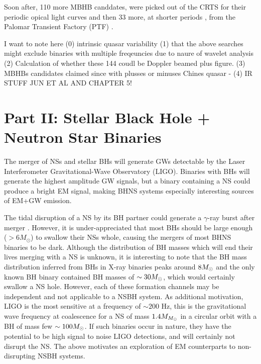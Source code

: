 Soon after, 110 more MBHB canddates, were picked out of the CRTS for
their periodic opical light curves \citep{Graham:2015b} and then 33 more, at
shorter periods \citep{CharisiMBHBs:2016}, from the Palomar Transient Factory
(PTF) \citep{}.

I want to note here 
(0) intrinsic quasar variability
(1) that the above searches might exclude binaries with multiple freqeuncies due to naure of wavelet analysis
(2) Calculation of whether these 144 coudl be Doppler beamed plus figure.
(3) MBHBs candidates claimed since with plusses or minuses
	Chines quasar - 
(4) IR STUFF JUN ET AL AND CHAPTER 5!






\section{Part II: Stellar Black Hole + Neutron Star Binaries}
%

The merger of NSs and stellar BHs will generate GWs detectable by the Laser
Interferometer Gravitational-Wave Observatory (LIGO). Binaries with BHs will
generate the highest amplitude GW signals, but a binary containing a NS could
produce a bright EM signal, making BHNS systems especially interesting sources
of EM+GW emission.

The tidal disruption of a NS by its BH partner could generate a $\gamma$-ray
burst after merger \citep{NPP:NSBH_GRB:1992}. However, it is under-appreciated
that most BHs should be large enough ($> 6M_\odot $) to swallow their NSs
whole, causing the mergers of most BHNS binaries to be dark. 
Although the distribution of BH masses
which will end their lives merging with a NS is unknown, it is interesting to
note that the BH mass distribution inferred from BHs in X-ray binaries peaks
around $8 {M_{\odot}}$ \citep{Orzel:2008} and the only known BH binary contained BH
masses of $\sim 30 {M_{\odot}}$, which would certainly swallow a NS hole. However,
each of these formation channels may be independent and not applicable to a
NSBH system. As additional motivation, LIGO is the most sensitive at a
frequency of $\sim 200$ Hz, this is the gravitational wave frequency at
coalescence for a NS of mass $1.4 M_{{M_{\odot}}}$ in a circular orbit with a BH of
mass few $\sim100 {M_{\odot}}$. If such binaries occur in nature, they have the
potential to be high signal to noise LIGO detections, and will certainly not
disrupt the NS. The above motivates an exploration of EM counterparts to non-
disrupting NSBH systems.




